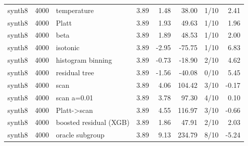 \begin{tabular}{lllrrrlr}
synth8 & 4000 & temperature & 3.89 & 1.48 & 38.00 & 1/10 & 2.41 \\
synth8 & 4000 & Platt & 3.89 & 1.93 & 49.63 & 1/10 & 1.96 \\
synth8 & 4000 & beta & 3.89 & 1.89 & 48.53 & 1/10 & 2.00 \\
synth8 & 4000 & isotonic & 3.89 & -2.95 & -75.75 & 1/10 & 6.83 \\
synth8 & 4000 & histogram binning & 3.89 & -0.73 & -18.90 & 2/10 & 4.62 \\
synth8 & 4000 & residual tree & 3.89 & -1.56 & -40.08 & 0/10 & 5.45 \\
synth8 & 4000 & scan & 3.89 & 4.06 & 104.42 & 3/10 & -0.17 \\
synth8 & 4000 & scan a=0.01 & 3.89 & 3.78 & 97.30 & 4/10 & 0.10 \\
synth8 & 4000 & Platt->scan & 3.89 & 4.55 & 116.97 & 3/10 & -0.66 \\
synth8 & 4000 & boosted residual (XGB) & 3.89 & 1.86 & 47.91 & 2/10 & 2.03 \\
synth8 & 4000 & oracle subgroup & 3.89 & 9.13 & 234.79 & 8/10 & -5.24 \\
\bottomrule
\end{tabular}
